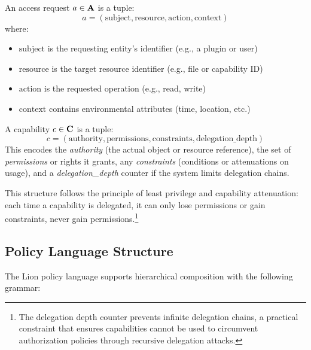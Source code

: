 \begin{definition}
\label{def:access-request-structure}
An access request $a \in \mathbf{A}$ is a tuple:
\begin{equation}
a = (\text{subject}, \text{resource}, \text{action}, \text{context})
\end{equation}
where:
\begin{itemize}
\item $\text{subject}$ is the requesting entity's identifier (e.g., a plugin or user)
\item $\text{resource}$ is the target resource identifier (e.g., file or capability ID)
\item $\text{action}$ is the requested operation (e.g., read, write)
\item $\text{context}$ contains environmental attributes (time, location, etc.)
\end{itemize}
\end{definition}

\begin{definition}
\label{def:capability-structure}
A capability $c \in \mathbf{C}$ is a tuple:
\begin{equation}
c = (\text{authority}, \text{permissions}, \text{constraints}, \text{delegation\_depth})
\end{equation}
This encodes the \emph{authority} (the actual object or resource reference), the set of \emph{permissions} or rights it grants, any \emph{constraints} (conditions or attenuations on usage), and a \emph{delegation\_depth} counter if the system limits delegation chains.

This structure follows the principle of least privilege and capability attenuation: each time a capability is delegated, it can only lose permissions or gain constraints, never gain permissions.\footnote{The delegation depth counter prevents infinite delegation chains, a practical constraint that ensures capabilities cannot be used to circumvent authorization policies through recursive delegation attacks.}

\newpage
\end{definition}

\subsection{Policy Language Structure}

The Lion policy language supports hierarchical composition with the following grammar:

